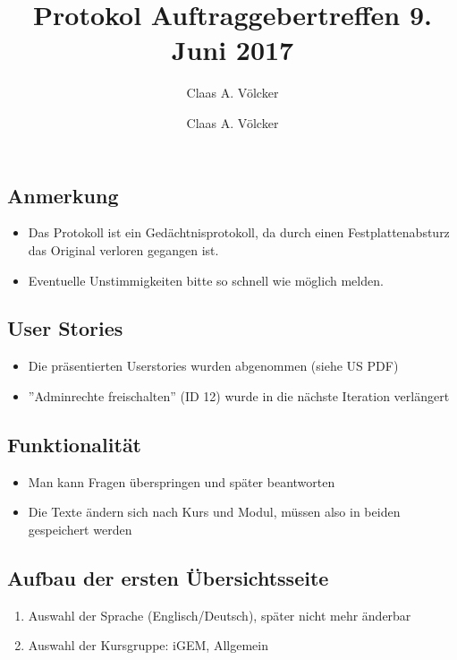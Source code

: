 \documentclass[colorback, accentcolor=tud1c, paper=a4]{tudexercise}
\title{Protokol Auftraggebertreffen 9. Juni 2017}
\subtitle{Claas A. Völcker}
\author{Claas A. Völcker}
\begin{document}
	
	\maketitle
	
	\begin{multicols}{2}
		\subsection*{Anmerkung}
		\begin{itemize}
			\item Das Protokoll ist ein Gedächtnisprotokoll, da durch einen Festplattenabsturz das Original verloren gegangen ist.
			\item Eventuelle Unstimmigkeiten bitte so schnell wie möglich melden.
		\end{itemize}
		
		\subsection*{User Stories}
		\begin{itemize}
			\item Die präsentierten Userstories wurden abgenommen (siehe US PDF)
			\item ''Adminrechte freischalten'' (ID 12) wurde in die nächste Iteration verlängert
		\end{itemize}
		
		\subsection*{Funktionalität}
		\begin{itemize}
			\item Man kann Fragen überspringen und später beantworten
			\item Die Texte ändern sich nach Kurs und Modul, müssen also in beiden gespeichert werden
		\end{itemize}
		
		\subsection*{Aufbau der ersten Übersichtsseite}
		\begin{enumerate}
			\item Auswahl der Sprache (Englisch/Deutsch), später nicht mehr änderbar
			\item Auswahl der Kursgruppe: iGEM, Allgemein
		\end{enumerate}
		

\end{multicols}
\end{document}
